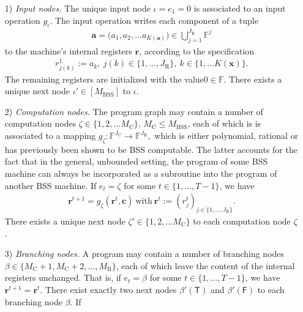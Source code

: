 \documentclass[conference]{IEEEtran}
\def\FF{{\mathbb F}}
\newcommand{\BSS}{\mathrm{BSS}}
\begin{document}
	\begin{itemize}	\item[1)] \emph{Input nodes.} The unique input node \(\iota = e_1 = 0\) is associated to an 
						input operation \(g_\iota\). The input operation writes each component of a tuple 
						\begin{align*} 	\bm{a} = \big(a_1,a_2,\ldots a_{K({\bm{a}})}\big) \in {\bigcup}_{j=1}^{J_{\mathrm{R}}} \FF^{j}
						\end{align*}
						to the machine's internal registers \(\bm{r}\), according to the specification
						\begin{align*}	r^1_{j(k)} := a_k ,~ j(k)\in \{1,\ldots,J_{\mathrm{R}}\},~ k\in \{1,\ldots K(\bm{x})\}.   
						\end{align*}
						The remaining registers are initialized with the value\linebreak \(0 \in \FF\).
						There exists a unique next node \(\iota' \in [M_\BSS]\) to \(\iota\).
					\item[2)] \emph{Computation nodes.} The program graph may contain a number of computation nodes \(\zeta \in \{1,2,\ldots M_{\mathrm{C}}\}\),    
						\linebreak \(M_{\mathrm{C}} \leq M_{\BSS}\), each of which is 
						is associated to a mapping 
						\( 	g_\zeta : \FF^{J_{\mathrm{C}}}\rightarrow \FF^{J_{\mathrm{R}}}, 
						\) 
						which is either polynomial, rational or has previously been shown to be BSS computable. The latter accounts for the fact that in the general, 
						unbounded setting, the program of some BSS machine can always be incorporated as a subroutine into the program of another BSS machine.
						If \(e_t = \zeta\) for some \(t\in\{1,\ldots, T-1\}\), we have
						\begin{align*}  \bm{r}^{t+1} = g_{\zeta}(\bm{r}^t,\bm{c})~\text{with}~\bm{r}^t := (r_j^t)_{j\in\{1,\ldots,J_{\mathrm{R}}\}}.
						\end{align*}
						There exists a unique next node \(\zeta' \in \{1,2,\ldots M_{\mathrm{C}}\}\) to each computation node \(\zeta\).
					\item[3)] \emph{Branching nodes.}  A program may contain a number of branching nodes \(\beta \in \{M_{\mathrm{C}} + 1, M_{\mathrm{C}} + 2,\ldots, M_\mathrm{B}\}\), 
						each of which leave the content of the internal registers unchanged. That is, if \(e_t = \beta\) for some \(t\in\{1,\ldots, T-1\}\), we have
						\(\bm{r}^{t+1} = \bm{r}^{t}\). There exist exactly two next nodes \(\beta'(\mathsf{T})\) and \(\beta'(\mathsf{F})\) to each branching node \(\beta\). If 

\end{itemize}
\end{document}
